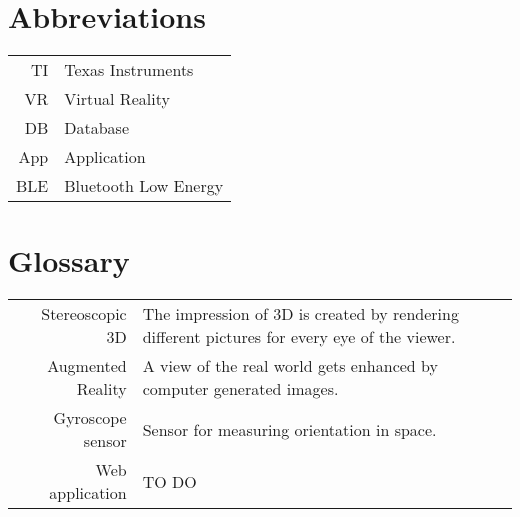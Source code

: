 \section{Abbreviations}

\begin{tabular}{rl}
TI & Texas Instruments\\
VR & Virtual Reality\\
DB & Database\\
App & Application\\
BLE & Bluetooth Low Energy\\

\end{tabular}
\bigskip

\section{Glossary}

\begin{tabular}{r p{11cm}}
Stereoscopic 3D & The impression of 3D is created by rendering different pictures for every eye of the viewer.\\
Augmented Reality & A view of the real world gets enhanced by computer generated images.\\
Gyroscope sensor & Sensor for measuring orientation in space.\\
Web application & TO DO
\end{tabular}